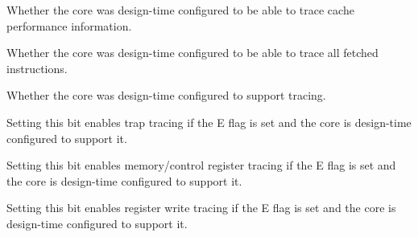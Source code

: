 \implementation{}

\reset{*}
Whether the core was design-time configured to be able to trace cache
performance information.

\implementation{}

\reset{*}
Whether the core was design-time configured to be able to trace all fetched
instructions.

\implementation{}

\reset{*}
Whether the core was design-time configured to support tracing.

\implementation{}

Setting this bit enables trap tracing if the E flag is set and the core is 
design-time configured to support it.

\implementation{}

Setting this bit enables memory/control register tracing if the E flag is set 
and the core is design-time configured to support it.

\implementation{}

Setting this bit enables register write tracing if the E flag is set and the 
core is design-time configured to support it.

